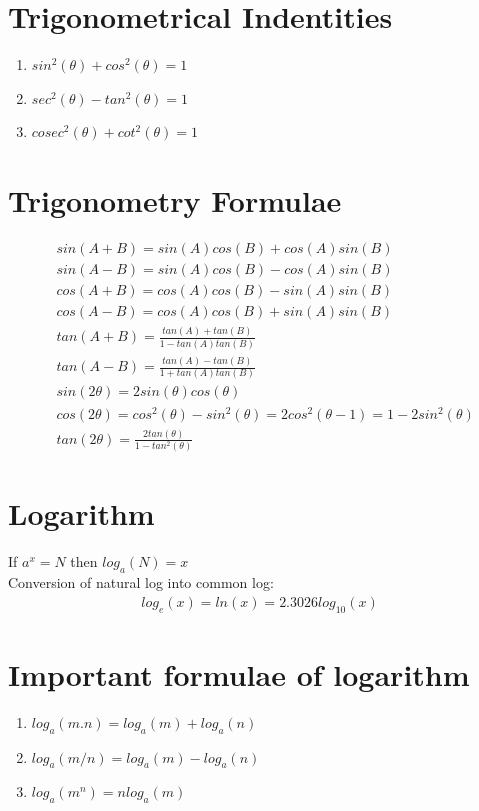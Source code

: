 \documentclass{article}
\begin{document}
\section{Trigonometrical Indentities}
\begin{enumerate}[label=(\roman*)]
    \item $sin^2(\theta) + cos^2(\theta)= 1$
    \item $sec^2(\theta) - tan^2(\theta)= 1$
    \item $cosec^2(\theta) + cot^2(\theta)= 1$
\end{enumerate}

\section{Trigonometry Formulae}
\begin{align*}
    &sin(A+B) = sin(A)cos(B) + cos(A)sin(B) \\
    &sin(A-B) = sin(A)cos(B) - cos(A)sin(B) \\
    &cos(A+B) = cos(A)cos(B) - sin(A)sin(B) \\
    &cos(A-B) = cos(A)cos(B) + sin(A)sin(B) \\
    &tan(A+B) = \frac{tan(A)+tan(B)}{1-tan(A)tan(B)} \\
    &tan(A-B) = \frac{tan(A)-tan(B)}{1+tan(A)tan(B)} \\
    &sin(2\theta) = 2sin(\theta)cos(\theta) \\
    &cos(2\theta) = cos^2(\theta) - sin^2(\theta) = 2cos^2(\theta - 1) = 1 - 2sin^2(\theta) \\
    &tan(2\theta) = \frac{2tan(\theta)}{1-tan^2(\theta)}
\end{align*}

\section{Logarithm}
If $a^x= N$ then $log_a(N)=x$ \\
Conversion of natural log into common log:
\begin{align*}
    log_e(x) = ln(x) = 2.3026log_{10}(x)
\end{align*}

\section{Important formulae of logarithm}
\begin{enumerate}[label=(\roman*)]
    \item $log_{a}(m.n) = log_a(m) + log_a(n)$
    \item $log_a(m/n)=log_a(m)-log_a(n)$
    \item $log_a(m^n)=nlog_a(m)$
\end{enumerate}
\end{document}
